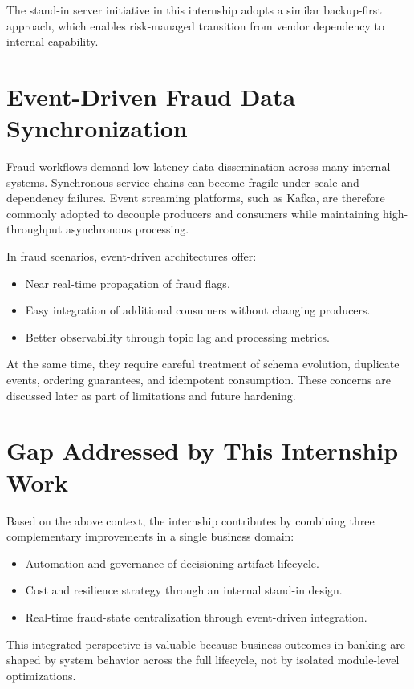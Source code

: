 The stand-in server initiative in this internship adopts a similar backup-first approach, which enables risk-managed transition from vendor dependency to internal capability.

\section{Event-Driven Fraud Data Synchronization}

Fraud workflows demand low-latency data dissemination across many internal systems. Synchronous service chains can become fragile under scale and dependency failures. Event streaming platforms, such as Kafka, are therefore commonly adopted to decouple producers and consumers while maintaining high-throughput asynchronous processing.

In fraud scenarios, event-driven architectures offer:

\begin{itemize}
	\item Near real-time propagation of fraud flags.
	\item Easy integration of additional consumers without changing producers.
	\item Better observability through topic lag and processing metrics.
\end{itemize}

At the same time, they require careful treatment of schema evolution, duplicate events, ordering guarantees, and idempotent consumption. These concerns are discussed later as part of limitations and future hardening.

\section{Gap Addressed by This Internship Work}

Based on the above context, the internship contributes by combining three complementary improvements in a single business domain:

\begin{itemize}
	\item Automation and governance of decisioning artifact lifecycle.
	\item Cost and resilience strategy through an internal stand-in design.
	\item Real-time fraud-state centralization through event-driven integration.
\end{itemize}

This integrated perspective is valuable because business outcomes in banking are shaped by system behavior across the full lifecycle, not by isolated module-level optimizations.